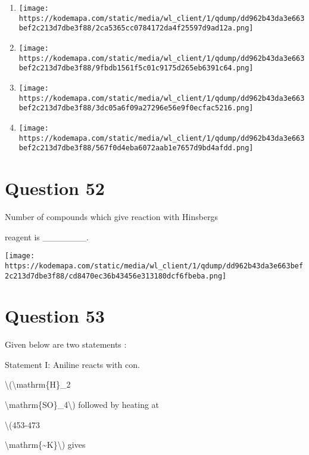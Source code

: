 \documentclass{article}
\begin{document}
\begin{enumerate}[label=(\alph*)]
\item \texttt{[image: https://kodemapa.com/static/media/wl\_client/1/qdump/dd962b43da3e663bef2c213d7dbe3f88/2ca5365cc0784172da4f25597d9ad12a.png]}


\item \texttt{[image: https://kodemapa.com/static/media/wl\_client/1/qdump/dd962b43da3e663bef2c213d7dbe3f88/9fbdb1561f5c01c9175d265eb6391c64.png]}


\item \texttt{[image: https://kodemapa.com/static/media/wl\_client/1/qdump/dd962b43da3e663bef2c213d7dbe3f88/3dc05a6f09a27296e56e9f0ecfac5216.png]}


\item \texttt{[image: https://kodemapa.com/static/media/wl\_client/1/qdump/dd962b43da3e663bef2c213d7dbe3f88/567f0d4eba6072aab1e7657d9bd4afdd.png]}


\end{enumerate}
\newpage
\section*{Question 52}
Number of compounds which give reaction with Hinsberg\textquotesingle s

reagent is \_\_\_\_\_\_\_.



\texttt{[image: https://kodemapa.com/static/media/wl\_client/1/qdump/dd962b43da3e663bef2c213d7dbe3f88/cd8470ec36b43456e313180dcf6fbeba.png]}\\



\hfill\break


\begin{enumerate}[label=(\alph*)]
\end{enumerate}
\newpage
\section*{Question 53}
Given below are two statements :



Statement I: Aniline reacts with con.

\textbackslash(\textbackslash mathrm\{H\}\_2

\textbackslash mathrm\{SO\}\_4\textbackslash) followed by heating at

\textbackslash(453-473

\textbackslash mathrm\{\textasciitilde K\}\textbackslash) gives
\end{document}
